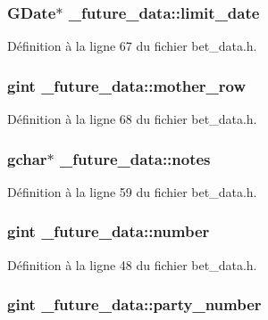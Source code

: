 \subsubsection[{limit\_\-date}]{\setlength{\rightskip}{0pt plus 5cm}GDate$\ast$ {\bf \_\-future\_\-data::limit\_\-date}}\label{struct__future__data_a81185f700098d78812314fcf51f83af2}


Définition à la ligne 67 du fichier bet\_\-data.h.

\subsubsection[{mother\_\-row}]{\setlength{\rightskip}{0pt plus 5cm}gint {\bf \_\-future\_\-data::mother\_\-row}}\label{struct__future__data_affc482dfcab885b68b3d48c15dae8208}


Définition à la ligne 68 du fichier bet\_\-data.h.

\subsubsection[{notes}]{\setlength{\rightskip}{0pt plus 5cm}gchar$\ast$ {\bf \_\-future\_\-data::notes}}\label{struct__future__data_a956a475ceab4f567c54155e84f364e21}


Définition à la ligne 59 du fichier bet\_\-data.h.

\subsubsection[{number}]{\setlength{\rightskip}{0pt plus 5cm}gint {\bf \_\-future\_\-data::number}}\label{struct__future__data_a6b5279b16d72b20955071d9157768b99}


Définition à la ligne 48 du fichier bet\_\-data.h.

\subsubsection[{party\_\-number}]{\setlength{\rightskip}{0pt plus 5cm}gint {\bf \_\-future\_\-data::party\_\-number}}\label{struct__future__data_af5492347097a217e0885fd32cd2d4ee9}


